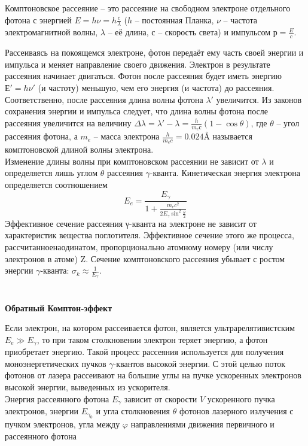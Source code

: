 \documentclass[__main__.tex]{subfiles}
\begin{document}
\begin{definition}
    Комптоновское рассеяние – это рассеяние на свободном электроне отдельного фотона с энергией $E = h\nu = h\frac{c}{\lambda}$ ($h$ – постоянная Планка, $ν$ – частота электромагнитной волны, $λ$ – её длина, $с$ – скорость света) и импульсом $р = \frac{E}{c}$.
\end{definition}

Рассеиваясь на покоящемся электроне, фотон передаёт ему часть своей энергии и импульса и меняет направление своего движения. Электрон в результате рассеяния начинает двигаться. Фотон после рассеяния будет иметь энергию $Е' = hν'$ (и частоту) меньшую, чем его энергия (и частота) до рассеяния. Соответственно, после рассеяния длина волны фотона $λ'$ увеличится. Из законов сохранения энергии и импульса следует, что длина волны фотона после рассеяния увеличится на величину $\Delta \lambda = \lambda' - \lambda = \frac{h}{m_e с}(1-\cos\theta)$, где $θ$ – угол рассеяния фотона, а $m_e$ – масса электрона $\frac{h}{m_e c} = 0.024 Å$ называется комптоновской длиной волны электрона.\\

Изменение длины волны при комптоновском рассеянии не зависит от $λ$ и определяется лишь углом $θ$ рассеяния $γ$-кванта. Кинетическая энергия электрона определяется соотношением
$$E_e = \frac{E_γ}{1+\frac{m_e c^2}{2E_γ \sin^2\frac{\theta}{2}}}$$
Эффективное сечение рассеяния γ-кванта на электроне не зависит от характеристик вещества поглотителя. Эффективное сечение этого же процесса,$ рассчитанное на один атом$, пропорционально атомному номеру (или числу электронов в атоме) Z.
Сечение комптоновского рассеяния убывает с ростом энергии $γ$-кванта: $\sigma_k \approx \frac{1}{E_γ}$.
\\\\\\
\textbf{Обратный Комптон-эффект}

Если электрон, на котором рассеивается фотон, является ультрарелятивистским $E_e \gg E_γ$, то при таком столкновении электрон теряет энергию, а фотон приобретает энергию. Такой процесс рассеяния используется для получения моноэнергетических пучков $γ$-квантов высокой энергии. С этой целью поток фотонов от лазера рассеивают на большие углы на пучке ускоренных электронов высокой энергии, выведенных из ускорителя.\\

Энергия рассеянного фотона $E_γ$ зависит от скорости $V$ ускоренного пучка электронов, энергии $E_{γ_0}$ и угла столкновения $θ$ фотонов лазерного излучения с пучком электронов, угла между $φ$ направлениями движения первичного и рассеянного фотона
\end{document}
